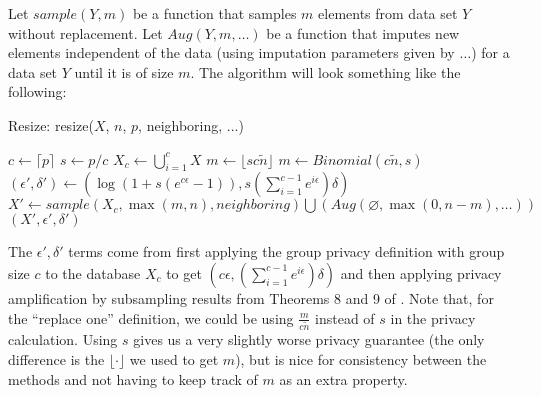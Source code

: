 \documentclass[11pt]{scrartcl} %
\begin{document}
Let $sample(Y, m)$ be a function that samples $m$ elements from data set $Y$ without replacement. 
Let $Aug(Y, m, \hdots)$ be a function that imputes new elements independent of the data (using imputation parameters given by $\hdots$) for a data set $Y$ until it is of size $m$. 
The algorithm will look something like the following:
\begin{algorithm}[H]
    \caption{Resize: resize($X$, $n$, $p$, neighboring, ...)}
    \label{alg:gen_resize}
    \begin{algorithmic}[1]
        \State $c \gets \lceil p \rceil$ 
        \State $s \gets p/c$ 
        \State $X_c \gets \bigcup_{i=1}^{c}X$ 
            \State $m \gets \lfloor sc\tilde{n} \rfloor$ 
            \State $m \gets Binomial(c\tilde{n}, s)$ 
        \EndIf
        \State $(\epsilon', \delta') \gets \left(\log\left(1+s\left(e^{c\epsilon}-1\right) \right), s\left(\sum_{i=1}^{c-1}e^{i \epsilon}\right)\delta \right)$ 
        \State $X' \gets sample\left( X_c, \max(m, n), neighboring \right) \bigcup \left( Aug(\varnothing, \max(0, n - m), \hdots) \right)$
        \\ \Return $(X', \epsilon', \delta')$
    \end{algorithmic}
\end{algorithm}

The $\epsilon', \delta'$ terms come from first applying the group privacy definition with group size $c$ to the 
database $X_c$ to get $\left(c\epsilon, \left(\sum_{i=1}^{c-1}e^{i \epsilon}\right)\delta \right)$ \cite{Vad17}
and then applying privacy amplification by subsampling results from Theorems 8 and 9 of \cite{BBG18}. 
Note that, for the ``replace one'' definition, we could be using $\frac{m}{c\tilde{n}}$ instead of $s$ in the privacy calculation. Using $s$ gives us a very slightly 
worse privacy guarantee (the only difference is the $\lfloor \cdot \rfloor$ we used to get $m$), but is nice for 
consistency between the methods and not having to keep track of $m$ as an extra property.
\end{document}

